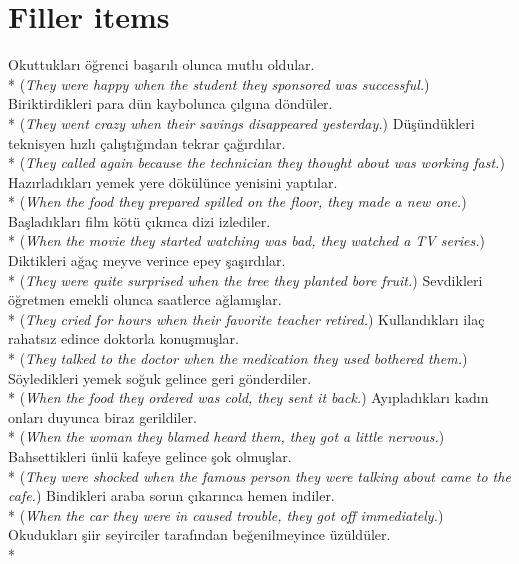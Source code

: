 \section{Filler items}
\ea Okuttuklar{\i} \"{o}\u{g}renci ba\c{s}ar{\i}l{\i} olunca mutlu oldular. \\*
({\it They were happy when the student they sponsored was successful.})
\ex Biriktirdikleri para d\"{u}n kaybolunca \c{c}{\i}lg{\i}na d\"{o}nd\"{u}ler. \\*
({\it They went crazy when their savings disappeared yesterday.})
\ex D\"{u}\c{s}\"{u}nd\"{u}kleri teknisyen h{\i}zl{\i} \c{c}al{\i}\c{s}t{\i}\u{g}{\i}ndan tekrar \c{c}a\u{g}{\i}rd{\i}lar. \\*
({\it They called again because the technician they thought about was working fast.})
\ex Haz{\i}rlad{\i}klar{\i} yemek yere d\"{o}k\"{u}l\"{u}nce yenisini yapt{\i}lar. \\*
({\it When the food they prepared spilled on the floor, they made a new one.})
\ex Ba\c{s}lad{\i}klar{\i} film k\"{o}t\"{u} \c{c}{\i}k{\i}nca dizi izlediler. \\*
({\it When the movie they started watching was bad, they watched a TV series.})
\ex Diktikleri a\u{g}a\c{c} meyve verince epey \c{s}a\c{s}{\i}rd{\i}lar. \\*
({\it They were quite surprised when the tree they planted bore fruit.})
\ex Sevdikleri \"{o}\u{g}retmen emekli olunca saatlerce a\u{g}lam{\i}\c{s}lar. \\*
({\it They cried for hours when their favorite teacher retired.})
\ex Kulland{\i}klar{\i} ila\c{c} rahats{\i}z edince doktorla konu\c{s}mu\c{s}lar. \\*
({\it They talked to the doctor when the medication they used bothered them.})
\ex S\"{o}yledikleri yemek so\u{g}uk gelince geri g\"{o}nderdiler. \\*
({\it When the food they ordered was cold, they sent it back.})
\ex Ay{\i}plad{\i}klar{\i} kad{\i}n onlar{\i} duyunca biraz gerildiler. \\*
({\it When the woman they blamed heard them, they got a little nervous.})
\ex Bahsettikleri \"{u}nl\"{u} kafeye gelince \c{s}ok olmu\c{s}lar. \\*
({\it They were shocked when the famous person they were talking about came to the cafe.})
\ex Bindikleri araba sorun \c{c}{\i}kar{\i}nca hemen indiler. \\*
({\it When the car they were in caused trouble, they got off immediately.})
\ex Okuduklar{\i} \c{s}iir seyirciler taraf{\i}ndan be\u{g}enilmeyince \"{u}z\"{u}ld\"{u}ler. \\*
